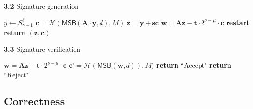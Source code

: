 \documentclass{article}
\theoremstyle{plain}
\theoremstyle{definition}
\begin{document}
    \begin{algorithm}
        \renewcommand{\thealgorithm}{}
        \caption{\textbf{3.2} Signature generation}
        \begin{algorithmic}[1]
            \Statex{}
            \State $y \gets S^{\ell}_{\gamma - 1}$
            \State $\mathbf{c} = \mathcal{H}(\mathsf{MSB}(\mathbf{A} \cdot \mathbf{y}, d),M)$
            \State $\mathbf{z} = \mathbf{y} + \mathbf{sc}$
            \State $\mathbf{w} = \mathbf{Az} - \mathbf{t} \cdot 2^{\nu - \mu} \cdot \mathbf{c}$
                \State \textbf{restart}
            \Else
                \State \textbf{return} $(\mathbf{z}, \mathbf{c})$
            \EndIf
        \end{algorithmic}
    \end{algorithm}

    \begin{algorithm}
        \renewcommand{\thealgorithm}{}
        \begin{algorithmic}[1]
        \caption{\textbf{3.3} Signature verification}
        \Statex{}
        \State $\mathbf{w} = \mathbf{Az} - \mathbf{t} \cdot 2^{\nu - \mu} \cdot \mathbf{c}$
        \State $\mathbf{c'} = \mathcal{H}(\mathsf{MSB}(\mathbf{w}, d)), M)$
            \State \textbf{return} ``Accept"
        \Else
            \State \textbf{return} ``Reject"
        \EndIf
        \end{algorithmic}
    \end{algorithm}

    \subsection{Correctness}
    \label{sec:correctness}
\end{document}
